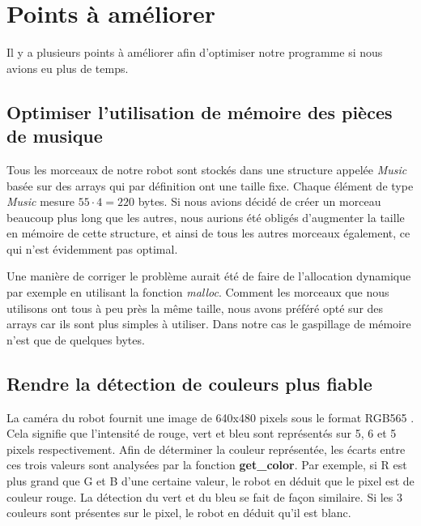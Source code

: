 \documentclass{article}
\begin{document}
    \section{Points à améliorer}
    Il y a plusieurs points à améliorer afin d'optimiser notre programme si nous avions eu plus de temps.

    \subsection{Optimiser l'utilisation de mémoire des pièces de musique}
    Tous les morceaux de notre robot sont stockés dans une structure appelée \textit{Music} basée sur des arrays qui par définition ont une taille fixe. Chaque élément de type \textit{Music} mesure $55 \cdot 4 = 220$ bytes. 
    Si nous avions décidé de créer un morceau beaucoup plus long que les autres, nous aurions été obligés d'augmenter la taille en mémoire de cette structure, et ainsi de tous les autres morceaux également, ce qui n'est évidemment pas optimal. 
    
    Une manière de corriger le problème aurait été de faire de l'allocation dynamique par exemple en utilisant la fonction \textit{malloc}.
    Comment les morceaux que nous utilisons ont tous à peu près la même taille, nous avons préféré opté sur des arrays car ils sont plus simples à utiliser.
    Dans notre cas le gaspillage de mémoire n'est que de quelques bytes.
    
    \subsection{Rendre la détection de couleurs plus fiable}
    \label{améliorer_couleur}
    La caméra du robot fournit une image de 640x480 pixels sous le format RGB565 \cite{camera}.
    Cela signifie que l'intensité de rouge, vert et bleu sont représentés sur 5, 6 et 5 pixels respectivement.
    Afin de déterminer la couleur représentée, les écarts entre ces trois valeurs sont analysées par la fonction \textbf{get\_color}.
    Par exemple, si R est plus grand que G et B d'une certaine valeur, le robot en déduit que le pixel est de couleur rouge.
    La détection du vert et du bleu se fait de façon similaire.
    Si les 3 couleurs sont présentes sur le pixel, le robot en déduit qu'il est blanc.
    
\end{document}
